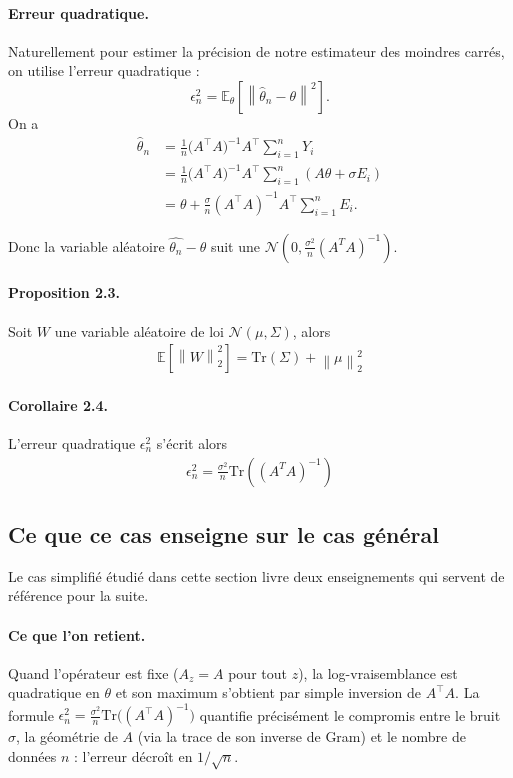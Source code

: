 \documentclass[12pt, a4paper]{article}
\theoremstyle{definition}
\newcommand{\E}{\mathbb{E}}
\newcommand{\norm}[1]{\left\|#1\right\|}
\newcommand{\Tr}{\mathrm{Tr}}
\begin{document}
\paragraph{Erreur quadratique.}
Naturellement pour estimer la précision de notre estimateur des moindres
carrés, on utilise l'erreur quadratique :
\[
    \epsilon_n^2 = \E_{\theta}\!\left[\norm{\hat{\theta}_n - \theta}^2\right].
\]
On a
\begin{align*}
    \hat{\theta}_n
    &= \frac{1}{n}\bigl(A^\top A\bigr)^{-1}A^\top\sum_{i=1}^{n} Y_i \\
    &= \frac{1}{n}\bigl(A^\top A\bigr)^{-1}A^\top\sum_{i=1}^{n} (A\theta + \sigma E_i) \\
    &= \theta + \frac{\sigma}{n}(A^\top A)^{-1}A^\top \sum_{i=1}^{n} E_i.
\end{align*}

Donc la variable aléatoire $\hat{\theta_n} - \theta$ suit une 
$\mathcal{N}(0, \frac{\sigma^2}{n}(A^TA)^{-1} )$.

\paragraph{Proposition 2.3.} 
Soit $W$ une variable aléatoire de loi $\mathcal{N}(\mu, \Sigma)$, alors
\begin{align*}
    \mathbb{E}[\norm{W}_2 ^2] = \Tr(\Sigma)
    + \norm{\mu}_2 ^2
\end{align*}

\paragraph{Corollaire 2.4.}
L'erreur quadratique $\epsilon_n^2$ s'écrit alors
\begin{align*}
    \epsilon_n^2 = \frac{\sigma^2}{n} \Tr((A^TA)^{-1})
\end{align*}


\subsection{Ce que ce cas enseigne sur le cas général}
\label{subsec:lecons}

Le cas simplifié étudié dans cette section livre deux enseignements qui servent
de référence pour la suite.

\paragraph{Ce que l'on retient.}
Quand l'opérateur est fixe ($A_z = A$ pour tout $z$), la log-vraisemblance est
quadratique en $\theta$ et son maximum s'obtient par simple inversion de
$A^\top A$. La formule $\epsilon_n^2 = \frac{\sigma^2}{n}\Tr\bigl((A^\top A)^{-1}\bigr)$
quantifie précisément le compromis entre le bruit $\sigma$, la géométrie de $A$
(via la trace de son inverse de Gram) et le nombre de données $n$ : l'erreur
décroît en $1/\sqrt{n}$.
\end{document}
